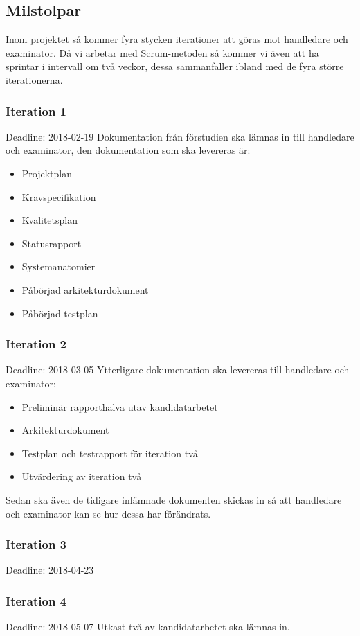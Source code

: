\documentclass[a4paper,10pt]{article}
\begin{document}
\subsection{Milstolpar}
Inom projektet så kommer fyra stycken iterationer att göras mot handledare och examinator. Då vi arbetar med Scrum-metoden så kommer vi även att ha sprintar i intervall om två veckor, dessa sammanfaller ibland med de fyra större iterationerna.
\subsubsection{Iteration 1}
Deadline: 2018-02-19
Dokumentation från förstudien ska lämnas in till handledare och examinator, den dokumentation som ska levereras är:
\begin{itemize}
\item Projektplan
\item Kravspecifikation
\item Kvalitetsplan
\item Statusrapport
\item Systemanatomier
\item Påbörjad arkitekturdokument
\item Påbörjad testplan
\end{itemize}
\subsubsection{Iteration 2}
Deadline: 2018-03-05
Ytterligare dokumentation ska levereras till handledare och examinator:
\begin{itemize}
\item Preliminär rapporthalva utav kandidatarbetet
\item Arkitekturdokument
\item Testplan och testrapport för iteration två
\item Utvärdering av iteration två
\end{itemize}
Sedan ska även de tidigare inlämnade dokumenten skickas in så att handledare och examinator kan se hur dessa har förändrats.
\subsubsection{Iteration 3}
Deadline: 2018-04-23
\subsubsection{Iteration 4}
Deadline: 2018-05-07
Utkast två av kandidatarbetet ska lämnas in.
\end{document}
